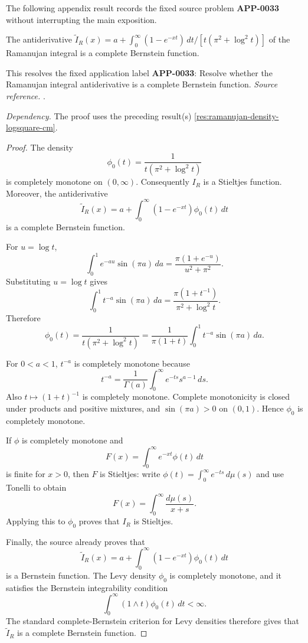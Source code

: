 The following appendix result records the fixed source problem \textbf{APP-0033} \cite{mishra-swaminathan-ramanujan} without interrupting the main exposition.
\begin{corollary}
\label{res:ramanujan-antiderivative-complete-bernstein}
The antiderivative \(\widetilde I_R(x)=a+\int_0^\infty(1-e^{-xt})\,dt/[t(\pi^2+\log^2 t)]\) of the Ramanujan integral is a complete Bernstein function.

This resolves the fixed application label \textbf{APP-0033}: Resolve whether the Ramanujan integral antiderivative is a complete Bernstein function.
\emph{Source reference.} \cite{mishra-swaminathan-ramanujan}.

\emph{Dependency.} The proof uses the preceding result(s) \ref{res:ramanujan-density-logsquare-cm}.
\end{corollary}
\begin{proof}
The density
\[
\phi_0(t)=\frac{1}{t(\pi^2+\log^2 t)}
\]
is completely monotone on \((0,\infty)\). Consequently \(I_R\) is a Stieltjes function. Moreover, the antiderivative
\[
\widetilde I_R(x)=a+\int_0^\infty (1-e^{-xt})\phi_0(t)\,dt
\]
is a complete Bernstein function.

For \(u=\log t\),
\[
\int_0^1 e^{-au}\sin(\pi a)\,da
=\frac{\pi(1+e^{-u})}{u^2+\pi^2}.
\]
Substituting \(u=\log t\) gives
\[
\int_0^1 t^{-a}\sin(\pi a)\,da
=\frac{\pi(1+t^{-1})}{\pi^2+\log^2 t}.
\]
Therefore
\[
\phi_0(t)
=\frac{1}{t(\pi^2+\log^2 t)}
=\frac{1}{\pi(1+t)}\int_0^1 t^{-a}\sin(\pi a)\,da.
\]

For \(0<a<1\), \(t^{-a}\) is completely monotone because
\[
t^{-a}=\frac1{\Gamma(a)}\int_0^\infty e^{-ts}s^{a-1}\,ds.
\]
Also \(t\mapsto(1+t)^{-1}\) is completely monotone. Complete monotonicity is closed under products and positive mixtures, and \(\sin(\pi a)>0\) on \((0,1)\). Hence \(\phi_0\) is completely monotone.

If \(\phi\) is completely monotone and
\[
F(x)=\int_0^\infty e^{-xt}\phi(t)\,dt
\]
is finite for \(x>0\), then \(F\) is Stieltjes: write \(\phi(t)=\int_0^\infty e^{-ts}\,d\mu(s)\) and use Tonelli to obtain
\[
F(x)=\int_0^\infty\frac{d\mu(s)}{x+s}.
\]
Applying this to \(\phi_0\) proves that \(I_R\) is Stieltjes.

Finally, the source already proves that
\[
\widetilde I_R(x)=a+\int_0^\infty (1-e^{-xt})\phi_0(t)\,dt
\]
is a Bernstein function. The Levy density \(\phi_0\) is completely monotone, and it satisfies the Bernstein integrability condition
\[
\int_0^\infty (1\wedge t)\phi_0(t)\,dt<\infty.
\]
The standard complete-Bernstein criterion for Levy densities therefore gives that \(\widetilde I_R\) is a complete Bernstein function.
\end{proof}

